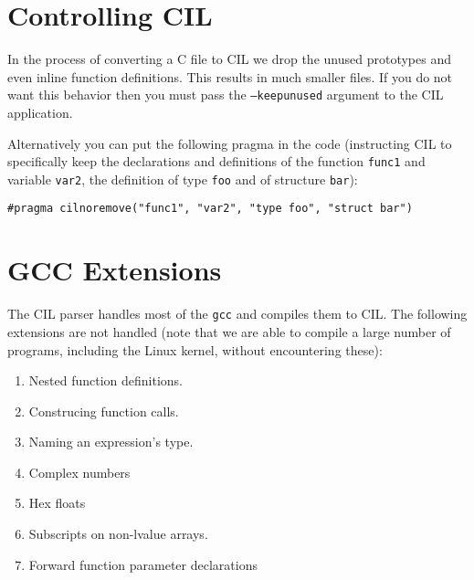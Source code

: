 \documentclass{article}
\def\t#1{{\tt #1}}
\begin{document}
\section{Controlling CIL}

 In the process of converting a C file to CIL we drop the unused prototypes
and even inline function definitions. This results in much smaller files. If
you do not want this behavior then you must pass the \t{--keepunused} argument
to the CIL application. 

 Alternatively you can put the following pragma in the code (instructing CIL
to specifically keep the declarations and definitions of the function
\t{func1} and variable \t{var2}, the definition of type \t{foo} and of
structure \t{bar}):
\begin{verbatim}
#pragma cilnoremove("func1", "var2", "type foo", "struct bar")
\end{verbatim}



\section{GCC Extensions}

 The CIL parser handles most of the \t{gcc}
and compiles them to CIL. The following extensions are not handled (note that
we are able to compile a large number of programs, including the Linux kernel,
without encountering these):

\begin{enumerate}
\item Nested function definitions.
\item Construcing function calls.
\item Naming an expression's type.
\item Complex numbers
\item Hex floats
\item Subscripts on non-lvalue arrays.
\item Forward function parameter declarations
\end{enumerate}
\end{document}
